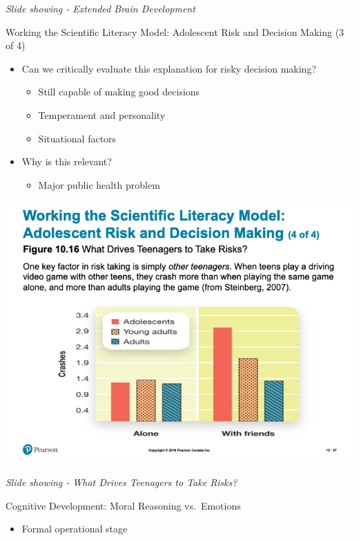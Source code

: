 \documentclass[
]{book}
\providecommand{\tightlist}{%
  \setlength{\itemsep}{0pt}\setlength{\parskip}{0pt}}
\begin{document}
\begin{reflect}
\emph{Slide showing - Extended Brain Development}

Working the Scientific Literacy Model: Adolescent Risk and Decision Making (3 of 4)

\begin{itemize}
\tightlist
\item
  Can we critically evaluate this explanation for risky decision making?

  \begin{itemize}
  \tightlist
  \item
    Still capable of making good decisions\\
  \item
    Temperament and personality\\
  \item
    Situational factors\\
  \end{itemize}
\item
  Why is this relevant?

  \begin{itemize}
  \tightlist
  \item
    Major public health problem
  \end{itemize}
\end{itemize}

\includegraphics{assets/unit_3/slide_47.png}

\emph{Slide showing - What Drives Teenagers to Take Risks?}

Cognitive Development: Moral Reasoning vs.~Emotions

\begin{itemize}
\tightlist
\item
  Formal operational stage


\end{itemize}
\end{reflect}
\end{document}

